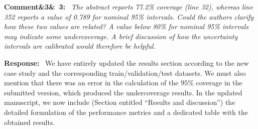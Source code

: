 \documentclass[11pt]{article}
\newenvironment{rcomment}[1]{\par\bigskip\noindent\textbf{Comment\ifx&#1&\else\ #1\fi:}\ \itshape}{\par}
\newenvironment{response}{\par\smallskip\noindent\color{resp}\textbf{Response:}\ }{\par}
\begin{document}
\begin{rcomment}{3}
The abstract reports 77.2\% coverage (line 32), whereas line 352 reports a value of 0.789 for nominal 95\% intervals.
Could the authors clarify how these two values are related? A value below 80\% for nominal 95\% intervals may indicate
some undercoverage. A brief discussion of how the uncertainty intervals are calibrated would therefore be helpful.
\end{rcomment}
\begin{response}
We have entirely updated the results section according to the new case study and the corresponding train/validation/test datasets. 
We must also mention that there was an error in the calculation of the $95\%$ coverage in the submitted version, which produced the undercoverage results. 
In the updated manuscript, we now include (Section entitled ``Results and discussion'') the detailed formulation of the performance metrics and a dedicated table with the obtained results. 
	

\end{response}
\end{document}
